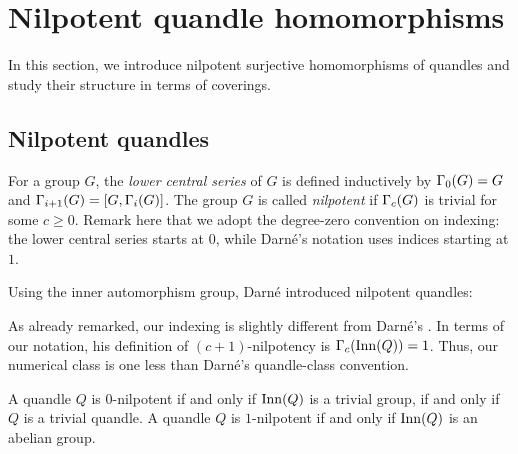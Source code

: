 \section{Nilpotent quandle homomorphisms}
\label{section: nilpotent homomorphisms}

In this section, we introduce nilpotent surjective homomorphisms of
quandles and study their structure in terms of coverings.


\subsection{Nilpotent quandles}
\label{subsection: nilpotent quandles}

For a group $G$, the \emph{lower central series} of $G$ is defined inductively by $\Gamma_0(G)=G$ and $\Gamma_{i+1}(G)=[G,\Gamma_i(G)]$. 
The group $G$ is called \emph{nilpotent} if $\Gamma_c(G)$ is trivial for some $c\geq 0$. 
Remark here that we adopt the degree-zero convention on indexing: the lower central series starts at $0$, while Darn\'e's notation uses indices starting at $1$.

Using the inner automorphism group, Darn\'e introduced nilpotent quandles:


\begin{rem}
    As already remarked, our indexing is slightly different from Darn\'e's \cite{darne_2026_nilpotent_quandles}.
    In terms of our notation, his definition of $(c+1)$-nilpotency is $\Gamma_{c}(\operatorname{Inn}(Q))=1$.
    Thus, our numerical class is one less than Darn\'e's quandle-class convention.
\end{rem}

\begin{eg}
    A quandle $Q$ is $0$-nilpotent if and only if $\operatorname{Inn}(Q)$ is a trivial group, if and only if $Q$ is a trivial quandle.
    A quandle $Q$ is $1$-nilpotent if and only if $\operatorname{Inn}(Q)$ is an abelian group.
\end{eg}




